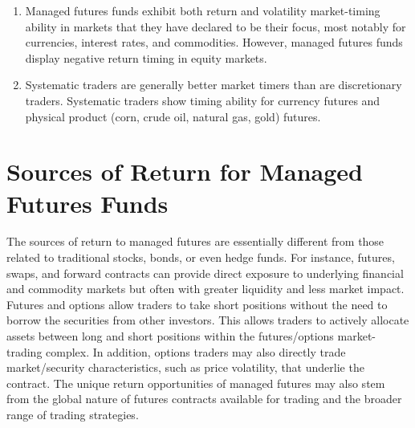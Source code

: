 \documentclass[11pt]{article}
\begin{document}
\begin{enumerate}
  \item Managed futures funds exhibit both return and volatility market-timing ability in markets that they have declared to be their focus, most notably for currencies, interest rates, and commodities. However, managed futures funds display negative return timing in equity markets.

  \item Systematic traders are generally better market timers than are discretionary traders. Systematic traders show timing ability for currency futures and physical product (corn, crude oil, natural gas, gold) futures.

\end{enumerate}

\section*{Sources of Return for Managed Futures Funds}
The sources of return to managed futures are essentially different from those related to traditional stocks, bonds, or even hedge funds. For instance, futures, swaps, and forward contracts can provide direct exposure to underlying financial and commodity markets but often with greater liquidity and less market impact. Futures and options allow traders to take short positions without the need to borrow the securities from other investors. This allows traders to actively allocate assets between long and short positions within the futures/options market-trading complex. In addition, options traders may also directly trade market/security characteristics, such as price volatility, that underlie the contract. The unique return opportunities of managed futures may also stem from the global nature of futures contracts available for trading and the broader range of trading strategies.
\end{document}
